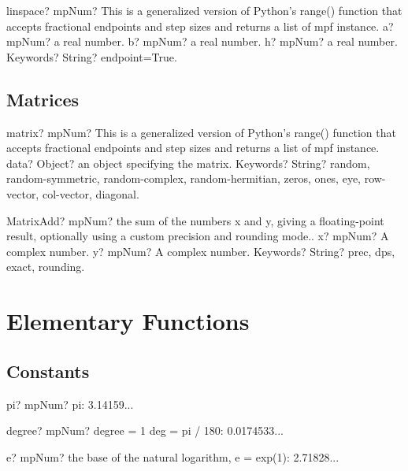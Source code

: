 \documentclass[12pt,a4paper,openany]{book}
\begin{document}
\begin{mpFunctionsExtract}
\mpFunctionFour
{linspace? mpNum?  This is a generalized version of Python's range() function that accepts fractional endpoints and step sizes and returns a list of mpf instance.}
{a? mpNum? a real number.}
{b? mpNum? a real number.}
{h? mpNum? a real number.}
{Keywords? String? endpoint=True.}
\end{mpFunctionsExtract}

\section{Matrices}

\begin{mpFunctionsExtract}
\mpFunctionTwo
{matrix? mpNum?  This is a generalized version of Python's range() function that accepts fractional endpoints and step sizes and returns a list of mpf instance.}
{data? Object? an object specifying the matrix.}
{Keywords? String? random, random-symmetric, random-complex, random-hermitian, zeros, ones, eye, row-vector, col-vector, diagonal.}
\end{mpFunctionsExtract}

\begin{mpFunctionsExtract}
\mpFunctionThree
{MatrixAdd? mpNum? the sum of the numbers x and y, giving a floating-point result, optionally using a custom precision and rounding mode..}
{x? mpNum? A complex number.}
{y? mpNum? A complex number.}
{Keywords? String? prec, dps, exact, rounding.}
\end{mpFunctionsExtract}

\chapter{Elementary Functions}

\section{Constants}

\begin{mpFunctionsExtract}
\mpFunctionZero
{pi? mpNum?  pi: 3.14159...}
\end{mpFunctionsExtract}

\begin{mpFunctionsExtract}
\mpFunctionZero
{degree? mpNum?  degree = 1 deg = pi / 180: 0.0174533...}
\end{mpFunctionsExtract}

\begin{mpFunctionsExtract}
\mpFunctionZero
{e? mpNum?  the base of the natural logarithm, e = exp(1): 2.71828...}
\end{mpFunctionsExtract}
\end{document}
